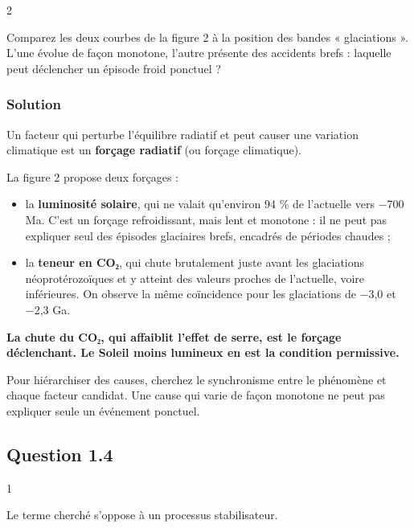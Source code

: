 \documentclass[11pt,a4paper]{article}
\providecommand{\tightlist}{\setlength{\itemsep}{0pt}\setlength{\parskip}{0pt}}
\begin{document}
\begin{indication}{2}

Comparez les deux courbes de la figure 2 à la position des bandes « glaciations ». L'une évolue de façon monotone, l'autre présente des accidents brefs : laquelle peut déclencher un épisode froid ponctuel ?

\end{indication}

\hypertarget{solution-2}{%
\subsubsection{Solution}\label{solution-2}}

Un facteur qui perturbe l'équilibre radiatif et peut causer une variation climatique est un \textbf{forçage radiatif} (ou forçage climatique).

La figure 2 propose deux forçages :

\begin{itemize}
\tightlist
\item
  la \textbf{luminosité solaire}, qui ne valait qu'environ 94 \% de l'actuelle vers −700 Ma. C'est un forçage refroidissant, mais lent et monotone : il ne peut pas expliquer seul des épisodes glaciaires brefs, encadrés de périodes chaudes ;
\item
  la \textbf{teneur en CO₂}, qui chute brutalement juste avant les glaciations néoprotérozoïques et y atteint des valeurs proches de l'actuelle, voire inférieures. On observe la même coïncidence pour les glaciations de −3,0 et −2,3 Ga.
\end{itemize}

\textbf{La chute du CO₂, qui affaiblit l'effet de serre, est le forçage déclenchant. Le Soleil moins lumineux en est la condition permissive.}

\begin{methode}

Pour hiérarchiser des causes, cherchez le synchronisme entre le phénomène et chaque facteur candidat. Une cause qui varie de façon monotone ne peut pas expliquer seule un événement ponctuel.

\end{methode}

\hypertarget{question-1.4}{%
\subsection{Question 1.4}\label{question-1.4}}

\begin{indication}{1}

Le terme cherché s'oppose à un processus stabilisateur.

\end{indication}
\end{document}
